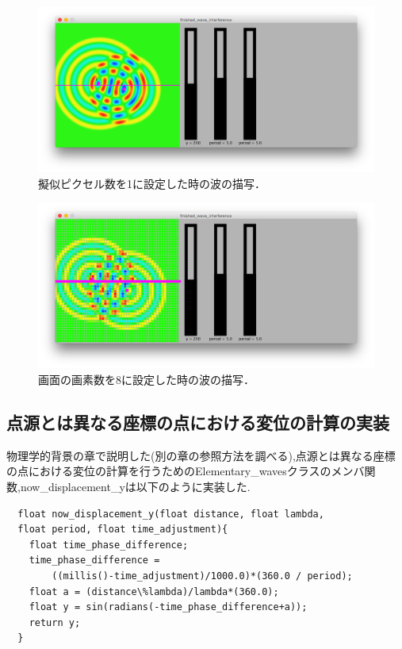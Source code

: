 \begin{figure}[htbp]
 \begin{center}
  \includegraphics[width=140mm]{../implement/pointregulation1.png}
 \end{center}
 \caption{擬似ピクセル数を1に設定した時の波の描写．}
 \label{fig:1pxceldraw}
\end{figure}


\begin{figure}[htbp]
 \begin{center}
  \includegraphics[width=140mm]{../implement/pointregulation8.png}
 \end{center}
 \caption{画面の画素数を8に設定した時の波の描写．}
 \label{fig:8pxceldraw}
\end{figure}



\subsection{点源とは異なる座標の点における変位の計算の実装}
物理学的背景の章で説明した(別の章の参照方法を調べる),点源とは異なる座標の点における変位の計算を行うためのElementary\_wavesクラスのメンバ関数,now\_displacement\_yは以下のように実装した.
\begin{screen}
{\small
\begin{verbatim}
  float now_displacement_y(float distance, float lambda, 
  float period, float time_adjustment){
    float time_phase_difference;
    time_phase_difference = 
    	((millis()-time_adjustment)/1000.0)*(360.0 / period);
    float a = (distance\%lambda)/lambda*(360.0);
    float y = sin(radians(-time_phase_difference+a));
    return y;
  }
\end{verbatim}}
\end{screen}

